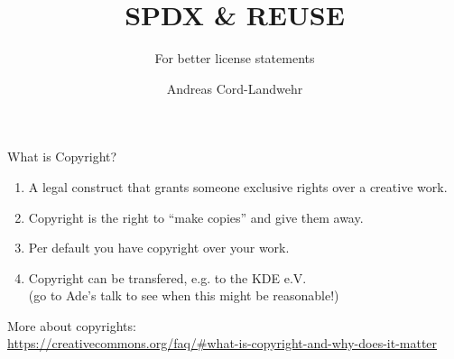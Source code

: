 \documentclass[t,compress,aspectratio=169]{beamer}
\title{SPDX \& REUSE}
\subtitle{For better license statements}
\author{Andreas Cord-Landwehr}
\begin{document}
\begin{withoutheadline}
\begin{frame}
\titlepage
\end{frame}
\end{withoutheadline}


\begin{frame}
    {What is Copyright?}

    \begin{enumerate}
        \item A legal construct that grants someone exclusive rights over a creative work.
        \item Copyright is the right to ``make copies'' and give them away.
        \item Per default you have copyright over your work.
        \item Copyright can be transfered, e.g. to the KDE e.V.\\ (go to Ade's talk to see when this might be reasonable!)
    \end{enumerate}
    \bigskip

    More about copyrights:\\
    \url{https://creativecommons.org/faq/\#what-is-copyright-and-why-does-it-matter}
\end{frame}
\end{document}
